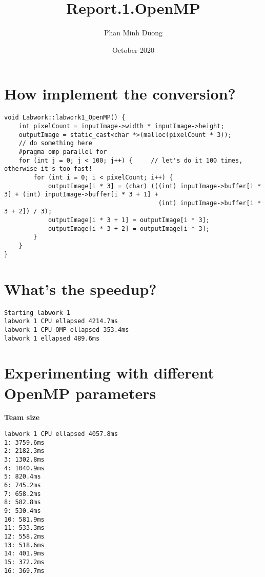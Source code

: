 \documentclass{article}
\title{Report.1.OpenMP}
\author{Phan Minh Duong}
\date{October 2020}
\begin{document}
\maketitle

\section{How implement the conversion?}
\begin{verbatim}
void Labwork::labwork1_OpenMP() {
    int pixelCount = inputImage->width * inputImage->height;
    outputImage = static_cast<char *>(malloc(pixelCount * 3));
    // do something here
    #pragma omp parallel for
    for (int j = 0; j < 100; j++) {     // let's do it 100 times, otherwise it's too fast!
        for (int i = 0; i < pixelCount; i++) {
            outputImage[i * 3] = (char) (((int) inputImage->buffer[i * 3] + (int) inputImage->buffer[i * 3 + 1] +
                                          (int) inputImage->buffer[i * 3 + 2]) / 3);
            outputImage[i * 3 + 1] = outputImage[i * 3];
            outputImage[i * 3 + 2] = outputImage[i * 3];
        }
    }
}
\end{verbatim}
\section{What’s the speedup?}
\begin{verbatim}
Starting labwork 1
labwork 1 CPU ellapsed 4214.7ms
labwork 1 CPU OMP ellapsed 353.4ms
labwork 1 ellapsed 489.6ms
\end{verbatim}
\section{Experimenting with different OpenMP parameters}
\textbf{Team size}
\begin{verbatim}
labwork 1 CPU ellapsed 4057.8ms
1: 3759.6ms
2: 2182.3ms
3: 1302.8ms
4: 1040.9ms
5: 820.4ms
6: 745.2ms
7: 658.2ms
8: 582.8ms
9: 530.4ms
10: 581.9ms
11: 533.3ms
12: 558.2ms
13: 518.6ms
14: 401.9ms
15: 372.2ms
16: 369.7ms
\end{verbatim}
\begin{verbatim}
\end{verbatim}
\end{document}
